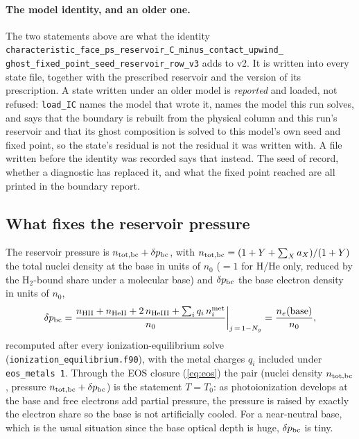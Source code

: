 \documentclass[english,a4paper]{my_memo}
\begin{document}
\paragraph{The model identity, and an older one.} The two statements above
are what the identity
\texttt{characteristic\_face\_ps\_reservoir\_C\_minus\_contact\_upwind\_\allowbreak
ghost\_fixed\_point\_seed\_reservoir\_row\_v3} adds to v2. It is written into
every state file, together with the prescribed reservoir and the version of
its prescription. A state written under an older model is \emph{reported} and
loaded, not refused: \texttt{load\_IC} names the model that wrote it, names
the model this run solves, and says that the boundary is rebuilt from the
physical column and this run's reservoir and that its ghost composition is
solved to this model's own seed and fixed point, so the state's residual is
not the residual it was written with. A file written before the identity was
recorded says that instead. The seed of record, whether a diagnostic has
replaced it, and what the fixed point reached are all printed in the boundary
report.

\subsection{What fixes the reservoir pressure}
\label{sec:dpbc}

The reservoir pressure is $n_{\rm tot,bc} + \delta p_{\rm bc}$, with
$n_{\rm tot,bc} = (1 + Y + \sum_X a_X)/(1+Y)$ the total nuclei density at
the base in units of $n_0$ ($=1$ for H/He only, reduced by the H$_2$-bound
share under a molecular base) and $\delta p_{\rm bc}$ the base electron
density in units of $n_0$,
\begin{equation}
\delta p_{\rm bc}
   = \frac{n_{\rm HII} + n_{\rm HeII} + 2\,n_{\rm HeIII}
           + \sum_i q_i\, n_i^{\rm met}}{n_0}
     \bigg|_{j\,=\,1-N_g}
   = \frac{n_e(\mbox{base})}{n_0},
\end{equation}
recomputed after every ionization-equilibrium solve
(\texttt{ionization\_equilibrium.f90}), with the metal charges $q_i$
included under \texttt{eos\_metals 1}. Through the EOS closure
(\ref{eq:eos}) the pair (nuclei density $n_{\rm tot,bc}$, pressure
$n_{\rm tot,bc}+\delta p_{\rm bc}$) is the statement $T = T_0$: as
photoionization develops at the base and free electrons add partial
pressure, the pressure is raised by exactly the electron share so the base
is not artificially cooled. For a near-neutral base, which is the usual
situation since the base optical depth is huge, $\delta p_{\rm bc}$ is tiny.
\end{document}
